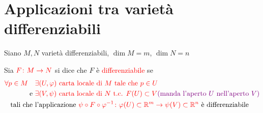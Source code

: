     \section{Applicazioni tra varietà differenziabili}
        \begin{definizione}
        \mbox{}

        Siano $M, N$ varietà differenziabili, $\dim M = m$, $\dim N = n$

        Sia $\textcolor{red}{F \colon M \to N}$ si dice che $F$ è \textcolor{red}{differenziabile} se
        \[
        \begin{aligned}
        \color{red} \forall p \in M \quad & \color{red} \exists (U, \varphi) \text{ carta locale di } M \text{ tale che } p \in U \\
        \text{ e } & \color{red} \exists (V, \psi) \text{ carta locale di } N \text{ t.c. } F(U) \subset V \textcolor{violet}{(\text{manda l'aperto } U \text{ nell'aperto } V)} \\
        \text{tali che } & \text{l'applicazione }  \textcolor{red}{\psi \circ F \circ \varphi^{-1} \colon \varphi(U) \subset \mathbb{R}^m \to \psi(V) \subset \mathbb{R}^n} \text{ è differenziabile}
        \end{aligned}
        \]

        
        \end{definizione}

